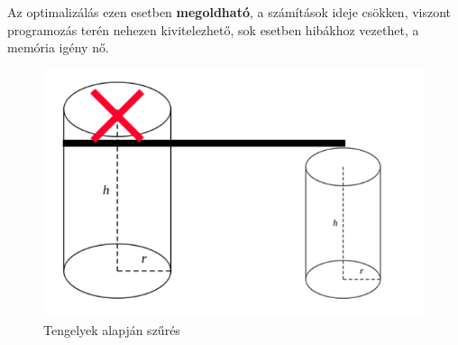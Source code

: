 Az optimalizálás ezen esetben \textbf{megoldható}, a számítások ideje csökken, viszont programozás terén nehezen kivitelezhető, sok esetben hibákhoz vezethet, a memória igény nő.
\begin{figure}[h]
	\centering
	\includegraphics[width=13truecm, height=7.5truecm]{images/opt_5.3.png}
	\caption{Tengelyek alapján szűrés}
	\label{fig:opt_3}
\end{figure}